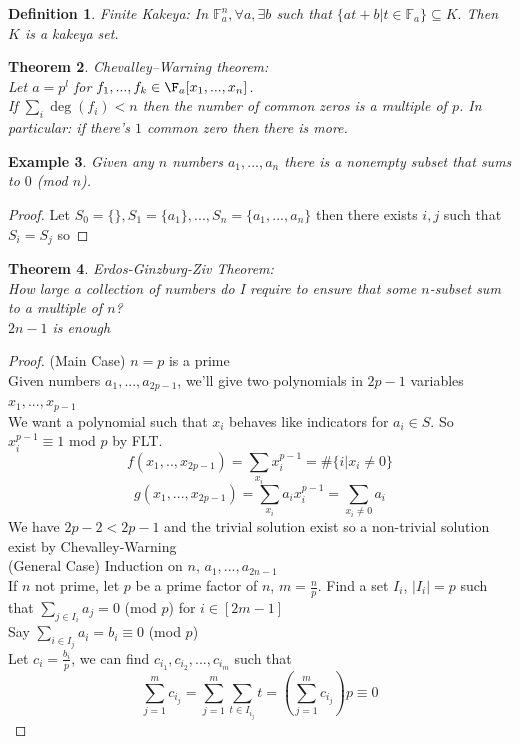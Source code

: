 \documentclass[a4paper]{article}
\newtheorem{thm}{Theorem}[section]
\newtheorem{defn}[thm]{Definition}
\newtheorem{eg}[thm]{Example}
\begin{document}
\begin{defn}
    Finite Kakeya: In $\mathbb{F}^n_a,\forall a,\exists b$ such that $\{at+b | t\in \mathbb{F}_a\}\subseteq K.$ Then $K$ is a kakeya set. 
\end{defn}
\begin{thm}
    Chevalley–Warning theorem: \\Let $a=p^l$ for $f_1,...,f_k\in \F_a[x_1,...,x_n]$.\\
    If $\sum_i \deg(f_i)<n$ then the number of common zeros is a multiple of $p$. In particular: if there's $1$ common zero then there is more.
\end{thm}
\begin{eg}
    Given any $n$ numbers $a_1,...,a_n$ there is a nonempty subset that sums to $0$ (mod $n$).
\end{eg}
\begin{proof}
    Let $S_0=\{\}, S_1=\{a_1\},...,S_n=\{a_1,...,a_n\}$ then there exists $i,j$ such that $S_i=S_j$ so 
\end{proof}
\begin{thm}
    Erdos-Ginzburg-Ziv Theorem:\\
    How large a collection of numbers do I require to ensure that some $n$-subset sum to a multiple of $n$?\\
    $2n-1$ is enough
\end{thm}
\begin{proof}
    (Main Case) $n=p$ is a prime\\
    Given numbers $a_1,...,a_{2p-1}$, we'll give two polynomials in $2p-1$ variables $x_1,...,x_{p-1}$\\
    We want a polynomial such that $x_i$ behaves like indicators for $a_i\in S.$ So $x_i^{p-1}\equiv 1$ mod $p$ by FLT.
    $$f(x_1,..,x_{2p-1})=\sum_{x_i}x_i^{p-1}=\#\{i | x_i\neq 0\}$$
    $$g(x_1,...,x_{2p-1})=\sum_{x_i}a_ix_i^{p-1}=\sum_{x_i\neq 0}a_i$$
    We have $2p-2<2p-1$ and the trivial solution exist so a non-trivial solution exist by Chevalley-Warning\\
    (General Case) Induction on $n$, $a_1,...,a_{2n-1}$\\
    If $n$ not prime, let $p$ be a prime factor of $n$, $m=\frac{n}{p}$. Find a set $I_i$, $|I_i|=p$ such that $\sum_{j\in I_i}a_j=0$ (mod $p$) for $i\in [2m-1]$\\
    Say $\sum_{i\in I_j}a_i=b_i \equiv 0$ (mod $p$)\\
    Let $c_i=\frac{b_i}{p}$, we can find $c_{i_1},c_{i_2},...,c_{i_m}$ such that $$\sum_{j=1}^{m}c_{i_j}=\sum_{j=1}^{m}\sum_{t\in I_{i_j}}t=\left (\sum_{j=1}^{m}c_{i_j} \right )p\equiv 0$$
\end{proof}
\end{document}
